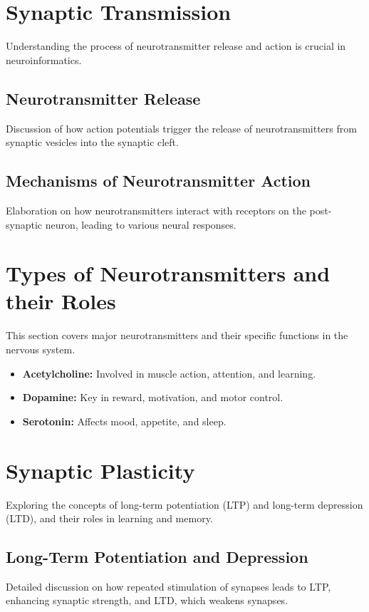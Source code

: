 \documentclass{article}
\begin{document}
\section{Synaptic Transmission}
Understanding the process of neurotransmitter release and action is crucial in neuroinformatics.

\subsection{Neurotransmitter Release}
Discussion of how action potentials trigger the release of neurotransmitters from synaptic vesicles into the synaptic cleft.

\subsection{Mechanisms of Neurotransmitter Action}
Elaboration on how neurotransmitters interact with receptors on the post-synaptic neuron, leading to various neural responses.

\section{Types of Neurotransmitters and their Roles}
This section covers major neurotransmitters and their specific functions in the nervous system.

\begin{itemize}
    \item \textbf{Acetylcholine:} Involved in muscle action, attention, and learning.
    \item \textbf{Dopamine:} Key in reward, motivation, and motor control.
    \item \textbf{Serotonin:} Affects mood, appetite, and sleep.
\end{itemize}

\section{Synaptic Plasticity}
Exploring the concepts of long-term potentiation (LTP) and long-term depression (LTD), and their roles in learning and memory.

\subsection{Long-Term Potentiation and Depression}
Detailed discussion on how repeated stimulation of synapses leads to LTP, enhancing synaptic strength, and LTD, which weakens synapses.
\end{document}
